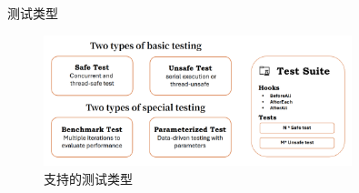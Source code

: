 \documentclass{beamer}
\begin{document}
\begin{frame}{测试类型}
    \begin{figure}
        \centering
        \includegraphics[width=0.8\textwidth]{img/types.png}
        \caption{支持的测试类型}
    \end{figure}
\end{frame}




\end{document}
